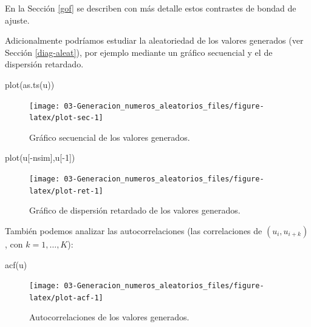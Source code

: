 \documentclass[
]{book}
\newenvironment{Shaded}{\begin{snugshade}}{\end{snugshade}}
\newcommand{\DecValTok}[1]{\textcolor[rgb]{0.00,0.00,0.81}{#1}}
\newcommand{\FunctionTok}[1]{\textcolor[rgb]{0.00,0.00,0.00}{#1}}
\newcommand{\NormalTok}[1]{#1}
\newcommand{\SpecialCharTok}[1]{\textcolor[rgb]{0.00,0.00,0.00}{#1}}
\theoremstyle{break}
\theoremstyle{definition}
\theoremstyle{definition}
\theoremstyle{definition}
\theoremstyle{definition}
\theoremstyle{remark}
\begin{document}
En la Sección \ref{gof} se describen con más detalle estos contrastes de bondad de ajuste.

Adicionalmente podríamos estudiar la aleatoriedad de los valores generados (ver Sección \ref{diag-aleat}), por ejemplo mediante un gráfico secuencial y el de dispersión retardado.

\begin{Shaded}
\begin{Highlighting}[]
\FunctionTok{plot}\NormalTok{(}\FunctionTok{as.ts}\NormalTok{(u))}
\end{Highlighting}
\end{Shaded}

\begin{figure}[!htb]

{\centering \texttt{[image: 03-Generacion\_numeros\_aleatorios\_files/figure-latex/plot-sec-1]} 

}

\caption{Gráfico secuencial de los valores generados.}\label{fig:plot-sec}
\end{figure}

\begin{Shaded}
\begin{Highlighting}[]
\FunctionTok{plot}\NormalTok{(u[}\SpecialCharTok{{-}}\NormalTok{nsim],u[}\SpecialCharTok{{-}}\DecValTok{1}\NormalTok{])}
\end{Highlighting}
\end{Shaded}

\begin{figure}[!htb]

{\centering \texttt{[image: 03-Generacion\_numeros\_aleatorios\_files/figure-latex/plot-ret-1]} 

}

\caption{Gráfico de dispersión retardado de los valores generados.}\label{fig:plot-ret}
\end{figure}

También podemos analizar las autocorrelaciones (las correlaciones de \((u_{i},u_{i+k})\), con \(k=1,\ldots,K\)):

\begin{Shaded}
\begin{Highlighting}[]
\FunctionTok{acf}\NormalTok{(u)}
\end{Highlighting}
\end{Shaded}

\begin{figure}[!htb]

{\centering \texttt{[image: 03-Generacion\_numeros\_aleatorios\_files/figure-latex/plot-acf-1]} 

}

\caption{Autocorrelaciones de los valores generados.}\label{fig:plot-acf}
\end{figure}
\end{document}
